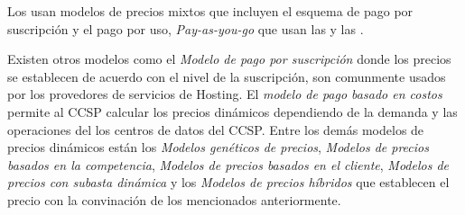 Los  usan modelos de precios mixtos que incluyen el esquema de pago por suscripción y el pago por uso, \emph{Pay-as-you-go} que usan las  y las . \bigskip

Existen otros modelos como el \emph{Modelo de pago por suscripción} donde los precios se establecen de acuerdo con el nivel de la suscripción, son comunmente usados por los provedores de servicios de \gls{Hosting}. El \emph{modelo de pago basado en costos} permite al \acrshort{CCSP} calcular los precios dinámicos dependiendo de la demanda y las operaciones del los centros de datos del \acrshort{CCSP}. Entre los demás modelos de precios dinámicos están los \emph{Modelos genéticos de precios}, \emph{Modelos de precios basados en la competencia}, \emph{Modelos de precios basados en el cliente}, \emph{Modelos de precios con subasta dinámica} y los \emph{Modelos de precios híbridos} que establecen el precio con la convinación de los mencionados anteriormente\cite[p.7]{soni2017pricing}.


